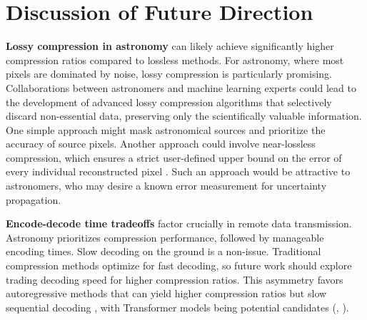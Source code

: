 \section{Discussion of Future Direction}
\label{sec:discussion}

\textbf{Lossy compression in astronomy} can  likely achieve significantly higher compression ratios compared to lossless methods. For astronomy, where most pixels are dominated by noise, lossy compression is particularly promising. Collaborations between astronomers and machine learning experts could lead to the development of advanced lossy compression algorithms that selectively discard non-essential data, preserving only the scientifically valuable information. One simple approach might mask astronomical sources and prioritize the accuracy of source pixels. Another approach could involve near-lossless compression, which ensures a strict user-defined upper bound on the error of every individual reconstructed pixel \citep{bai2022}. Such an approach would be attractive to astronomers, who may desire a known error measurement for uncertainty propagation. 



\textbf{Encode-decode time tradeoffs} factor crucially in remote data transmission. Astronomy prioritizes compression performance, followed by manageable encoding times. Slow decoding on the ground is a non-issue. Traditional compression methods optimize for fast decoding, so future work should explore trading decoding speed for higher compression ratios. This asymmetry favors autoregressive methods that can yield higher compression ratios but slow sequential decoding \citep{yang2023introduction}, with Transformer models being potential candidates (\citet{child2019generating}, \citet{roy2021efficient}).


